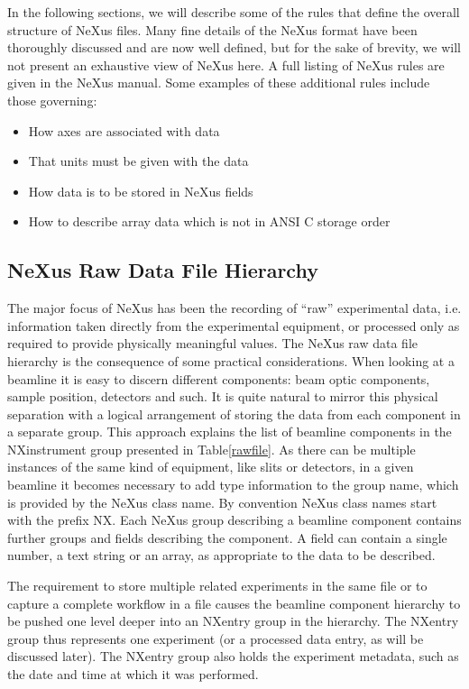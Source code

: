 \documentclass[%
 aip,
rsi,
 amsmath,amssymb,
 reprint,%
]{revtex4-1}
\begin{document}
In the following sections, we will describe some of the rules that define the overall structure of NeXus files. Many fine details 
of the NeXus format have been thoroughly discussed and are now well defined, but for the sake of brevity, we will not present an 
exhaustive view of NeXus here. A full listing of NeXus rules are given in the NeXus manual\cite{nxman}. Some examples of these 
additional rules include those governing:
\begin{itemize}
\item How axes are associated with data
\item That units must be given with the data
\item How data is to be stored in NeXus fields
\item How to describe array data which is not in ANSI C storage order
\end{itemize}



\subsection{NeXus Raw Data File Hierarchy}
The major focus of NeXus has been the recording of ``raw'' experimental data, i.e. information taken directly from the experimental 
equipment, or processed only as required to provide physically meaningful values.
The NeXus raw data file hierarchy is the consequence of some practical considerations. When looking at a beamline it is easy to 
discern different components: beam optic components, sample position, detectors and such. It is quite natural to mirror this physical 
separation with a logical arrangement of storing the data from each component in a separate group. This approach explains the 
list of beamline components in the NXinstrument group presented in Table\ref{rawfile}. 
As there can be multiple instances of the same kind of equipment, like slits or detectors, in a given beamline it becomes necessary
to add type information to the group name, which is provided by the NeXus class name. By convention NeXus class names start 
with the prefix NX. Each NeXus group describing a beamline component contains further groups and fields describing the component. 
A field can contain a single number, a text string or an array, as appropriate to the data to be described.  

The requirement to store multiple related experiments in the same file or to capture 
a complete workflow in a file causes the beamline component hierarchy to be pushed one level deeper into an NXentry 
group in the hierarchy. The NXentry  group thus represents one experiment (or a processed data entry, as will be discussed later). 
The NXentry group also holds the experiment metadata, such as the date and time at which it was performed. 
\end{document}
